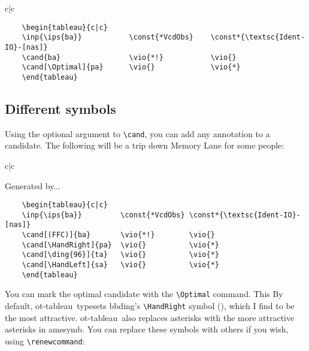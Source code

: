 \documentclass{article}
\def\tabl{\textsf{ot-tableau}}
\begin{document}
\CircledViolationsOn
\begin{center}
	\begin{tableau}{c|c}
				
			\vio{*!}	\vio{}
		\vio{}		\vio{*}
	\end{tableau}
\end{center}
\CircledViolationsOff

\begin{verbatim}
	\begin{tableau}{c|c}
	\inp{\ips{ba}}           \const{*VcdObs}    \const*{\textsc{Ident-IO}-[nas]}
	\cand{ba}                \vio{*!}           \vio{}
	\cand[\Optimal]{pa}      \vio{}             \vio{*}
	\end{tableau}
\end{verbatim}

\subsection{Different symbols}
Using the optional argument to \verb+\cand+, you can add any annotation to a candidate. The following will be a trip down Memory Lane for some people:

\begin{center}
	\begin{tableau}{c|c}
	          
	       \vio{*!}        \vio{}
	  \vio{}          \vio{*}
	   \vio{}          \vio{*}
	   \vio{}          \vio{*}
	\end{tableau}
\end{center}

\noindent Generated by...

\begin{verbatim}
	\begin{tableau}{c|c}
	\inp{\ips{ba}}         \const{*VcdObs} \const*{\textsc{Ident-IO}-[nas]}
	\cand[(FFC)]{ba}       \vio{*!}        \vio{}
	\cand[\HandRight]{pa}  \vio{}          \vio{*}
	\cand[\ding{96}]{ta}   \vio{}          \vio{*}
	\cand[\HandLeft]{sa}   \vio{}          \vio{*}
	\end{tableau}
\end{verbatim}

You can mark the optimal candidate with the \verb+\Optimal+ command. This 
By default, \tabl\ typesets \textsf{bbding}'s \verb+\HandRight+ symbol (\HandRight), which I find to be the most attractive. \tabl\ also replaces asterisks with the more attractive asterisks in \textsf{amssymb}. You can replace these symbols with others if you wish, using \verb+\renewcommand+:
\end{document}
